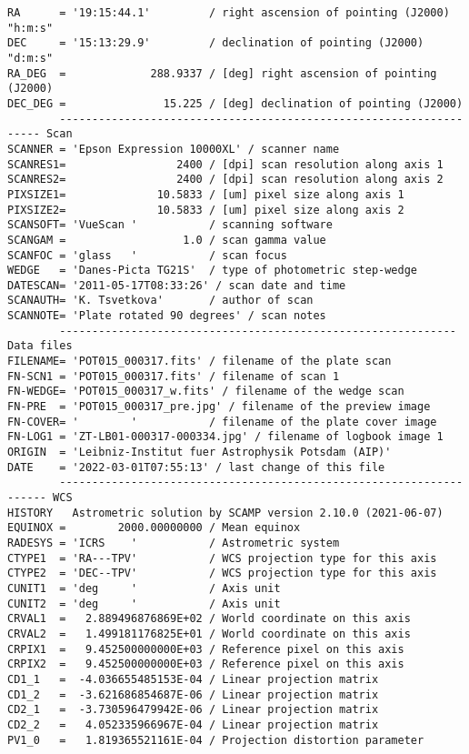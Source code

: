 \documentclass[11pt]{ivoa}
\begin{document}
\begin{lstlisting}
RA      = '19:15:44.1'         / right ascension of pointing (J2000) "h:m:s"
DEC     = '15:13:29.9'         / declination of pointing (J2000) "d:m:s"
RA_DEG  =             288.9337 / [deg] right ascension of pointing (J2000)
DEC_DEG =               15.225 / [deg] declination of pointing (J2000)
        ------------------------------------------------------------------- Scan
SCANNER = 'Epson Expression 10000XL' / scanner name
SCANRES1=                 2400 / [dpi] scan resolution along axis 1
SCANRES2=                 2400 / [dpi] scan resolution along axis 2
PIXSIZE1=              10.5833 / [um] pixel size along axis 1
PIXSIZE2=              10.5833 / [um] pixel size along axis 2
SCANSOFT= 'VueScan '           / scanning software
SCANGAM =                  1.0 / scan gamma value
SCANFOC = 'glass   '           / scan focus
WEDGE   = 'Danes-Picta TG21S'  / type of photometric step-wedge
DATESCAN= '2011-05-17T08:33:26' / scan date and time
SCANAUTH= 'K. Tsvetkova'       / author of scan
SCANNOTE= 'Plate rotated 90 degrees' / scan notes
        ------------------------------------------------------------- Data files
FILENAME= 'POT015_000317.fits' / filename of the plate scan
FN-SCN1 = 'POT015_000317.fits' / filename of scan 1
FN-WEDGE= 'POT015_000317_w.fits' / filename of the wedge scan
FN-PRE  = 'POT015_000317_pre.jpg' / filename of the preview image
FN-COVER= '        '           / filename of the plate cover image
FN-LOG1 = 'ZT-LB01-000317-000334.jpg' / filename of logbook image 1
ORIGIN  = 'Leibniz-Institut fuer Astrophysik Potsdam (AIP)'
DATE    = '2022-03-01T07:55:13' / last change of this file
        -------------------------------------------------------------------- WCS
HISTORY   Astrometric solution by SCAMP version 2.10.0 (2021-06-07)
EQUINOX =        2000.00000000 / Mean equinox
RADESYS = 'ICRS    '           / Astrometric system
CTYPE1  = 'RA---TPV'           / WCS projection type for this axis
CTYPE2  = 'DEC--TPV'           / WCS projection type for this axis
CUNIT1  = 'deg     '           / Axis unit
CUNIT2  = 'deg     '           / Axis unit
CRVAL1  =   2.889496876869E+02 / World coordinate on this axis
CRVAL2  =   1.499181176825E+01 / World coordinate on this axis
CRPIX1  =   9.452500000000E+03 / Reference pixel on this axis
CRPIX2  =   9.452500000000E+03 / Reference pixel on this axis
CD1_1   =  -4.036655485153E-04 / Linear projection matrix
CD1_2   =  -3.621686854687E-06 / Linear projection matrix
CD2_1   =  -3.730596479942E-06 / Linear projection matrix
CD2_2   =   4.052335966967E-04 / Linear projection matrix
PV1_0   =   1.819365521161E-04 / Projection distortion parameter

\end{lstlisting}
\end{document}
